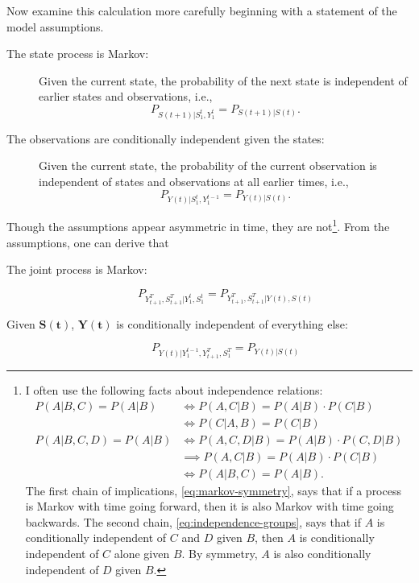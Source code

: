 \documentclass[]{article}
\newcommand{\ts}[3]{#1_{#2}^{#3}}                    %
\newcommand{\ti}[2]{{#1}{(#2)}}                  %
\newcommand{\ie}{i.e.\xspace}
\begin{document}
Now examine this calculation more carefully beginning with a statement
of the model assumptions.
\begin{description}
\item[The state process is Markov:] Given the current state, the
  probability of the next state is independent of earlier states and
  observations, \ie,
  \begin{equation}
    \label{eq:assume_markov}
    P_{\ti{S}{t+1}|\ts{S}{1}{t},\ts{Y}{1}{t}} = %
        P_{\ti{S}{t+1}|\ti{S}{t}}.
  \end{equation}
\item[The observations are conditionally independent given the states:]
  Given the current state, the probability of the current observation is
  independent of states and observations at all earlier times, \ie,
  \begin{equation}
    \label{eq:assume_output}
    P_{\ti{Y}{t}|\ts{S}{1}{t},\ts{Y}{1}{t-1}} = %
        P_{\ti{Y}{t}|\ti{S}{t}}.
  \end{equation}
\end{description}
Though the assumptions appear asymmetric in time, they are
not\footnote{I often use the following facts about independence
  relations:
  \begin{align}
    P(A|B,C) = P(A|B)   &\iff     P(A,C|B) = P(A|B) \cdot P(C|B)\nonumber\\
    \label{eq:markov-symmetry}%
                        &\iff     P(C|A,B) = P(C|B)\\
    P(A|B,C,D) = P(A|B) &\iff     P(A,C,D|B) = P(A|B) \cdot P(C,D|B)\nonumber\\
                        &\implies P(A,C|B) = P(A|B) \cdot P(C|B)\nonumber\\
    \label{eq:independence-groups}%
                        &\iff     P(A|B,C) = P(A|B).
  \end{align}
  The first chain of implications, \eqref{eq:markov-symmetry}, says
  that if a process is Markov with time going forward, then it is also
  Markov with time going backwards.  The second chain,
  \eqref{eq:independence-groups}, says that if $A$ is conditionally
  independent of $C$ and $D$ given $B$, then $A$ is conditionally
  independent of $C$ alone given $B$.  By symmetry, $A$ is also
  conditionally independent of $D$ given $B$.}.  From the assumptions,
one can derive that
\begin{description}
\item[The joint process is Markov:]
  \begin{equation*}
    P_{\ts{Y}{t+1}{T},\ts{S}{t+1}{T}|\ts{Y}{1}{t},\ts{S}{1}{t}}
      = P_{\ts{Y}{t+1}{T},\ts{S}{t+1}{T}|\ti{Y}{t},\ti{S}{t}}
  \end{equation*}
\item[Given $\bm{\ti{S}{t}}$, $\bm{\ti{Y}{t}}$ is conditionally independent of everything else:]
  \begin{equation*}
    P_{\ti{Y}{t} |\ts{Y}{1}{t-1},\ts{Y}{t+1}{T}, \ts{S}{1}{T}} = P_{\ti{Y}{t} |\ti{S}{t}}
  \end{equation*}
\end{description}
\end{document}

